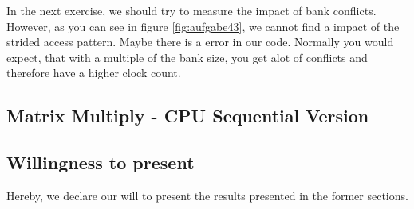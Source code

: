 \documentclass[12pt]{article}
\begin{document}
In the next exercise, we should try to measure the impact of bank conflicts. However, as you can see in figure \ref{fig:aufgabe43}, we cannot find a impact of the strided access pattern. Maybe there is a error in our code. Normally you would expect, that with a multiple of the bank size, you get alot of conflicts and therefore have a higher clock count.


\subsection{Matrix Multiply - CPU Sequential Version}

\subsection{Willingness to present}
Hereby, we declare our will to present the results presented in the former sections.
\end{document}
